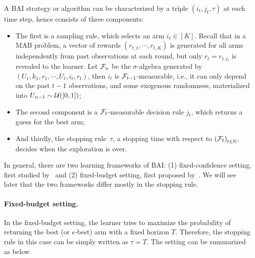 A BAI strategy or algorithm can be characterized by a triple $(i_t, j_t, \tau)$ at each time step, hence consists of three components: 
\begin{itemize}
    \item The first is a \gls{sampling rule}, which selects an arm $i_t\in[K]$. Recall that in a MAB problem, a vector of rewards $(r_{t,1},\cdots,r_{t,K})$ is generated for all arms independently from past observations at each round, but only $r_t = r_{t,i_t}$ is revealed to the learner. Let $\mathcal{F}_n$ be the $\sigma$-algebra generated by $(U_1,k_1,r_1,\cdots,U_t,i_t,r_t)$, then $i_t$ is $\mathcal{F}_{t-1}$-measurable, i.e., it can only depend on the past $t-1$ observations, and some exogenous randomness, materialized into $U_{n-1} \sim \mathcal{U}([0,1])$;
    \item The second component is a $\mathcal{F}_{t}$-measurable \gls{decision rule} $j_t$, which returns a guess for the best arm;
    \item And thirdly, the \gls{stopping rule}~$\tau$, a stopping time with respect to $\left(\mathcal{F}_{t}\right)_{t \in \mathbb{N}}$, decides when the exploration is over.
\end{itemize}

In general, there are two learning frameworks of BAI: (1) \gls{fixed-confidence setting}, first studied by~\citep{even-dar2003confidence} and (2) \gls{fixed-budget setting}, first proposed by~\citep{audibert2010budget}. We will see later that the two frameworks differ mostly in the stopping rule.

\paragraph{Fixed-budget setting.}

In the fixed-budget setting, the learner tries to maximize the probability of returning the best (or $\epsilon$-best) arm with a fixed horizon $T$. Therefore, the stopping rule in this case can be simply written as $\tau=T$. The setting can be summarized as below.


